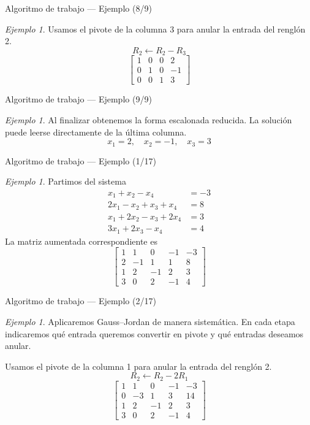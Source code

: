 \documentclass[aspectratio=169,11pt]{beamer}
\theoremstyle{remark}
\newtheorem{Ejem}[definicion]{Ejemplo}
\begin{document}
\begin{frame}{Algoritmo de trabajo — Ejemplo (8/9)}
\begin{Ejem}
Usamos el pivote de la columna 3 para anular la entrada del renglón 2.
\[
R_{2}\leftarrow R_{2}-R_{3}
\]
\[
\left[\begin{array}{ccc|c}
1 & 0 & 0 & 2\\
0 & 1 & 0 & -1\\
0 & 0 & 1 & 3
\end{array}\right]
\]
\end{Ejem}
\end{frame}

\begin{frame}{Algoritmo de trabajo — Ejemplo (9/9)}
\begin{Ejem}
Al finalizar obtenemos la forma escalonada reducida. La solución puede leerse directamente de la última columna.
\[
\boxed{x_{1}=2,\quad x_{2}=-1,\quad x_{3}=3}
\]
\end{Ejem}
\end{frame}

\begin{frame}{Algoritmo de trabajo — Ejemplo (1/17)}
\begin{Ejem}
Partimos del sistema
\[
\begin{aligned}
x_{1} + x_{2} - x_{4} &= -3\\
2 x_{1} - x_{2} + x_{3} + x_{4} &= 8\\
x_{1} + 2 x_{2} - x_{3} + 2 x_{4} &= 3\\
3 x_{1} + 2 x_{3} - x_{4} &= 4
\end{aligned}
\]
La matriz aumentada correspondiente es
\[
\left[\begin{array}{cccc|c}
1 & 1 & 0 & -1 & -3\\
2 & -1 & 1 & 1 & 8\\
1 & 2 & -1 & 2 & 3\\
3 & 0 & 2 & -1 & 4
\end{array}\right]
\]
\end{Ejem}
\end{frame}

\begin{frame}{Algoritmo de trabajo — Ejemplo (2/17)}
\begin{Ejem}
Aplicaremos Gauss--Jordan de manera sistemática. En cada etapa indicaremos qué entrada queremos convertir en pivote y qué entradas deseamos anular.


Usamos el pivote de la columna 1 para anular la entrada del renglón 2.
\[
R_{2}\leftarrow R_{2}-2R_{1}
\]
\[
\left[\begin{array}{cccc|c}
1 & 1 & 0 & -1 & -3\\
0 & -3 & 1 & 3 & 14\\
1 & 2 & -1 & 2 & 3\\
3 & 0 & 2 & -1 & 4
\end{array}\right]
\]
\end{Ejem}
\end{frame}
\end{document}
